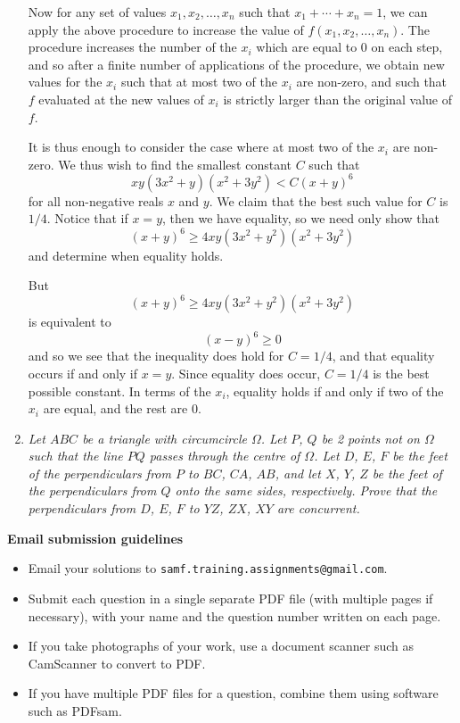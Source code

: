 \documentclass{article}
\begin{document}
\begin{enumerate}[1.]
Now for any set of values $x_1, x_2, \dots, x_n$ such that $x_1 + \cdots + x_n = 1$, we can apply the above procedure to increase the value of $f(x_1, x_2, \dots, x_n)$. The procedure increases the number of the $x_i$ which are equal to $0$ on each step, and so after a finite number of applications of the procedure, we obtain new values for the $x_i$ such that at most two of the $x_i$ are non-zero, and such that $f$ evaluated at the new values of $x_i$ is strictly larger than the original value of $f$.

It is thus enough to consider the case where at most two of the $x_i$ are non-zero. We thus wish to find the smallest constant $C$ such that
\[
	x y (3x^2 + y)(x^2 + 3y^2) < C{(x + y)}^6
\]
for all non-negative reals $x$ and $y$. We claim that the best such value for $C$ is $1/4$. Notice that if $x = y$, then we have equality, so we need only show that
\[
	{(x + y)}^6 \geq 4xy(3x^2 + y^2)(x^2 + 3y^2)
\]
and determine when equality holds.

But
\[
	{(x + y)}^6 \geq 4xy(3x^2 + y^2)(x^2 + 3y^2)
\]
is equivalent to
\[
	{(x - y)}^6 \geq 0
\]
and so we see that the inequality does hold for $C = 1/4$, and that equality occurs if and only if $x = y$. Since equality does occur, $C = 1/4$ is the best possible constant. In terms of the $x_i$, equality holds if and only if two of the $x_i$ are equal, and the rest are $0$.

\vspace{6pt}
\item 
\textit{Let $ABC$ be a triangle with circumcircle $\Omega$. Let $P$, $Q$ be 2 points not on $\Omega$ such that the line $PQ$ passes through the centre of $\Omega$. Let $D$, $E$, $F$ be the feet of the perpendiculars from $P$ to $BC$, $CA$, $AB$, and let $X$, $Y$, $Z$ be the feet of the perpendiculars from $Q$ onto the same sides, respectively. Prove that the perpendiculars from $D$, $E$, $F$ to $YZ$, $ZX$, $XY$ are concurrent.}

\end{enumerate}


\vfill
\textbf{\Large Email submission guidelines}
\begin{itemize}
	\item Email your solutions to \verb!samf.training.assignments@gmail.com!.
	\item Submit each question in a single separate PDF file (with multiple pages if necessary), with your name and the question number written on each page.
	\item If you take photographs of your work, use a document scanner such as CamScanner to convert to PDF.
	\item If you have multiple PDF files for a question, combine them using software such as PDFsam.
\end{itemize}
\end{document}

